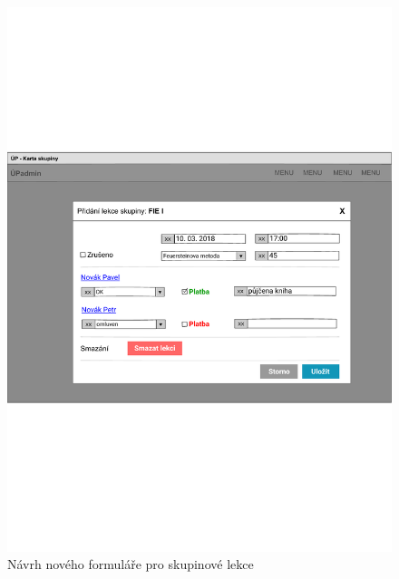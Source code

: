 \begin{figure}[h]\centering
    \includegraphics[width=1\textwidth]{img/ui-lekce-skupina}
    \caption{Návrh nového formuláře pro skupinové lekce}\label{fig:ui-lekce-skupina}
\end{figure}

